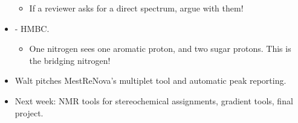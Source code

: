 \documentclass[../notes.tex]{subfiles}
\begin{document}
\begin{itemize}
\begin{itemize}
        \item If a reviewer asks for a direct  spectrum, argue with them!
    \end{itemize}
    \item {}- HMBC.
    \begin{itemize}
        \item One nitrogen sees one aromatic proton, and two sugar protons. This is the bridging nitrogen!
    \end{itemize}
    \item Walt pitches MestReNova's multiplet tool and automatic peak reporting.
    \item Next week: NMR tools for stereochemical assignments, gradient tools, final project.
\end{itemize}
\end{document}
